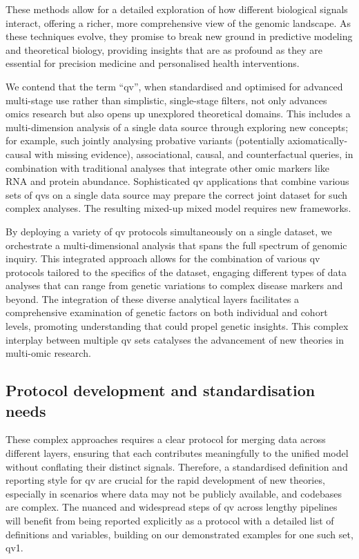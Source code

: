 These methods allow for a detailed exploration of how different biological signals interact, offering a richer, more comprehensive view of the genomic landscape. 
As these techniques evolve, they promise to break new ground in predictive modeling and theoretical biology, providing insights that are as profound as they are essential for precision medicine and personalised health interventions.

We contend that the term ``\ac{qv}'', when standardised and optimised for advanced multi-stage use rather than simplistic, single-stage filters, not only advances omics research but also opens up unexplored theoretical domains. 
This includes a multi-dimension analysis of a single data source through exploring new concepts; for example, such jointly analysing probative variants (potentially axiomatically-causal with missing evidence), 
associational, causal, and counterfactual queries, in combination with traditional analyses that integrate other omic markers like RNA and protein abundance.
Sophisticated \ac{qv} applications that combine various sets of \ac{qv}s on a single data source may prepare the correct joint dataset for such complex analyses.
The resulting mixed-up mixed model requires new frameworks.

By deploying a variety of \ac{qv} protocols simultaneously on a single dataset, we orchestrate a multi-dimensional analysis that spans the full spectrum of genomic inquiry. This integrated approach allows for the combination of various \ac{qv} protocols tailored to the specifics of the dataset, engaging different types of data analyses that can range from genetic variations to complex disease markers and beyond. 
The integration of these diverse analytical layers facilitates a comprehensive examination of genetic factors on both individual and cohort levels, promoting understanding that could propel genetic insights. This complex interplay between multiple \ac{qv} sets catalyses the advancement of new theories in multi-omic research.


\subsection{Protocol development and standardisation needs} 

These complex approaches requires a clear protocol for merging data across different layers, ensuring that each contributes meaningfully to the unified model without conflating their distinct signals. 
Therefore, a standardised definition and reporting style for \ac{qv} are crucial for the rapid development of new theories, especially in scenarios where data may not be publicly available, and codebases are complex. 
The nuanced and widespread steps of \ac{qv} across lengthy pipelines will benefit from being reported explicitly as a protocol with a detailed list of definitions and variables, building on our demonstrated examples for one such set, \ac{qv}1.


